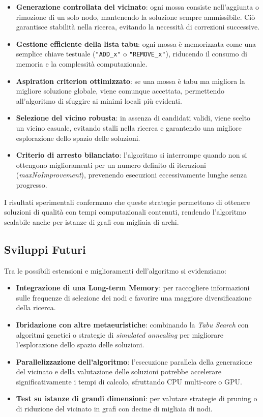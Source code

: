 \begin{itemize}
    \item \textbf{Generazione controllata del vicinato}: ogni mossa consiste nell'aggiunta o rimozione di un solo nodo, mantenendo la soluzione sempre ammissibile. Ciò garantisce stabilità nella ricerca, evitando la necessità di correzioni successive.
    \item \textbf{Gestione efficiente della lista tabu}: ogni mossa è memorizzata come una semplice chiave testuale (\texttt{"ADD\_x"} o \texttt{"REMOVE\_x"}), riducendo il consumo di memoria e la complessità computazionale.
    \item \textbf{Aspiration criterion ottimizzato}: se una mossa è tabu ma migliora la migliore soluzione globale, viene comunque accettata, permettendo all'algoritmo di sfuggire ai minimi locali più evidenti.
    \item \textbf{Selezione del vicino robusta}: in assenza di candidati validi, viene scelto un vicino casuale, evitando stalli nella ricerca e garantendo una migliore esplorazione dello spazio delle soluzioni.
    \item \textbf{Criterio di arresto bilanciato}: l’algoritmo si interrompe quando non si ottengono miglioramenti per un numero definito di iterazioni (\textit{maxNoImprovement}), prevenendo esecuzioni eccessivamente lunghe senza progresso.
\end{itemize}

I risultati sperimentali confermano che queste strategie permettono di ottenere soluzioni di qualità con tempi computazionali contenuti, rendendo l'algoritmo scalabile anche per istanze di grafi con migliaia di archi.

\subsection{Sviluppi Futuri}

Tra le possibili estensioni e miglioramenti dell'algoritmo si evidenziano:

\begin{itemize}
    \item \textbf{Integrazione di una Long-term Memory}: per raccogliere informazioni sulle frequenze di selezione dei nodi e favorire una maggiore diversificazione della ricerca.
    \item \textbf{Ibridazione con altre metaeuristiche}: combinando la \textit{Tabu Search} con algoritmi genetici o strategie di \textit{simulated annealing} per migliorare l’esplorazione dello spazio delle soluzioni.
    \item \textbf{Parallelizzazione dell'algoritmo}: l'esecuzione parallela della generazione del vicinato e della valutazione delle soluzioni potrebbe accelerare significativamente i tempi di calcolo, sfruttando CPU multi-core o GPU.
    \item \textbf{Test su istanze di grandi dimensioni}: per valutare strategie di pruning o di riduzione del vicinato in grafi con decine di migliaia di nodi.
\end{itemize}

